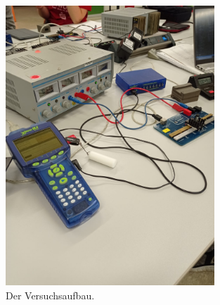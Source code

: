 \begin{figure}[h]
    \centering
    \includegraphics[width=0.7\textwidth]{latex/images/aufbau.jpeg}
    \caption{Der Versuchsaufbau.}
    \label{img:mess1}
  \end{figure}
  